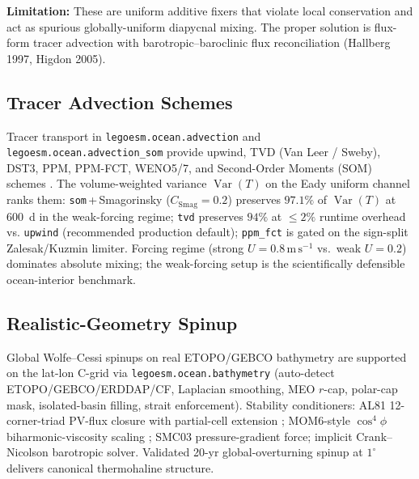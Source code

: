 \documentclass[11pt,a4paper]{article}
\DeclareMathOperator{\Var}{Var}
\begin{document}
\textbf{Limitation:} These are uniform additive fixers that violate local conservation and act as spurious globally-uniform diapycnal mixing.  The proper solution is flux-form tracer advection with barotropic--baroclinic flux reconciliation (Hallberg 1997, Higdon 2005).

\subsection{Tracer Advection Schemes}

Tracer transport in \texttt{legoesm.ocean.advection} and
\texttt{legoesm.ocean.advection\_som} provide upwind, TVD (Van Leer / Sweby),
DST3, PPM, PPM-FCT, WENO5/7, and Second-Order Moments
(SOM) schemes \citep{Prather1986}.  The volume-weighted variance $\Var(T)$ on the Eady
uniform channel ranks them: \texttt{som}\,+\,Smagorinsky
($C_{\mathrm{Smag}}{=}0.2$) preserves $97.1\%$ of $\Var(T)$ at
600~d in the weak-forcing regime; \texttt{tvd} preserves $94\%$ at
$\le 2\%$ runtime overhead vs. \texttt{upwind} (recommended
production default); \texttt{ppm\_fct} is gated on the sign-split
Zalesak/Kuzmin limiter.  Forcing regime (strong
$U{=}0.8\,\mathrm{m\,s^{-1}}$ vs.\ weak $U{=}0.2$) dominates absolute
mixing; the weak-forcing setup is the scientifically defensible
ocean-interior benchmark.

\subsection{Realistic-Geometry Spinup}

Global Wolfe--Cessi spinups on real ETOPO/GEBCO bathymetry are
supported on the lat-lon C-grid via \texttt{legoesm.ocean.bathymetry}
(auto-detect ETOPO/GEBCO/ERDDAP/CF, Laplacian smoothing, MEO
$r$-cap, polar-cap mask, isolated-basin filling, strait
enforcement).  Stability conditioners: AL81 12-corner-triad
PV-flux closure with partial-cell extension
\citep[][\texttt{pv\_flux\_al81\_partial\_cell}]{LeSommer2009}; MOM6-style $\cos^4\phi$
biharmonic-viscosity scaling \citep[][\texttt{biharmonic\_scaling\_factor}]{GriffiesHallberg2000}; SMC03 pressure-gradient force; implicit
Crank--Nicolson barotropic solver.  Validated 20-yr global-overturning
spinup at $1^\circ$ delivers canonical thermohaline structure.
\end{document}
